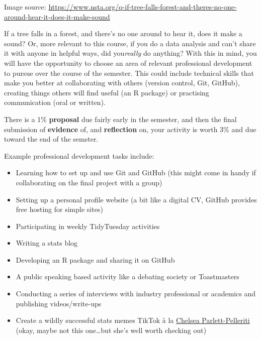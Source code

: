 \documentclass[
  openany]{book}
\begin{document}
Image source: \url{https://www.nsta.org/q-if-tree-falls-forest-and-theres-no-one-around-hear-it-does-it-make-sound}

If a tree falls in a forest, and there's no one around to hear it, does it make a sound? Or, more relevant to this course, if you do a data analysis and can't share it with anyone in helpful ways, did you\emph{really} do anything? With this in mind, you will have the opportunity to choose an area of relevant professional development to pursue over the course of the semester. This could include technical skills that make you better at collaborating with others (version control, Git, GitHub), creating things others will find useful (an R package) or practising communication (oral or written).

There is a 1\% \textbf{proposal} due fairly early in the semester, and then the final submission of \textbf{evidence} of, and \textbf{reflection} on, your activity is worth 3\% and due toward the end of the semster.

Example professional development tasks include:

\begin{itemize}
\item
  Learning how to set up and use Git and GitHub (this might come in handy if collaborating on the final project with a group)
\item
  Setting up a personal profile website (a bit like a digital CV, GitHub provides free hosting for simple sites)
\item
  Participating in weekly TidyTuesday activities
\item
  Writing a stats blog
\item
  Developing an R package and sharing it on GitHub
\item
  A public speaking based activity like a debating society or Toastmasters
\item
  Conducting a series of interviews with industry professional or academics and publishing videos/write-ups
\item
  Create a wildly successful stats memes TikTok à la \href{https://www.tiktok.com/@chelseaparlettpelleriti/video/6811647290709757189?u_code=d894729j1bcal8\&preview_pb=0\&language=en\&timestamp=1585960235\&user_id=6736543492652696582\&utm_campaign=client_share\&app=musically\&utm_medium=ios\&user_id=6736543492652696582\&tt_from=twitter\&utm_source=twitter\&source=h5_m}{Chelsea Parlett-Pelleriti} (okay, maybe not this one\ldots but she's well worth checking out)
\end{itemize}
\end{document}
